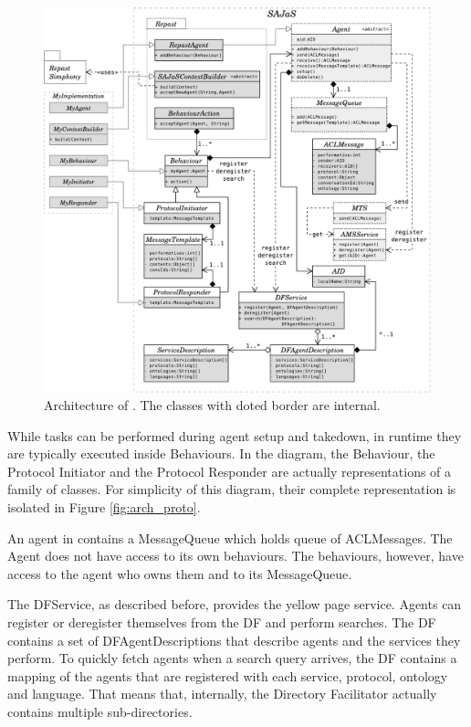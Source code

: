 \begin{figure}[h]
	\centering
	\includegraphics[width=\linewidth]{figures/sajas_arch.pdf}
	\caption[\apiname{}'s architecture]{Architecture of \apiname{}. The classes with doted border are internal.}
	\label{fig:arch}
\end{figure}

While tasks can be performed during agent setup and takedown, in runtime they are typically executed inside Behaviours. In the diagram, the Behaviour, the Protocol Initiator and the Protocol Responder are actually representations of a family of classes. For simplicity of this diagram, their complete representation is isolated in Figure \ref{fig:arch_proto}.

An agent in \apiname{} contains a MessageQueue which holds queue of ACLMessages. The Agent does not have access to its own behaviours. The behaviours, however, have access to the agent who owns them and to its MessageQueue.

The DFService, as described before, provides the yellow page service. Agents can register or deregister themselves from the DF and perform searches. The DF contains a set of DFAgentDescriptions that describe agents and the services they perform. To quickly fetch agents when a search query arrives, the DF contains a mapping of the agents that are registered with each service, protocol, ontology and language. That means that, internally, the Directory Facilitator actually contains multiple sub-directories.


